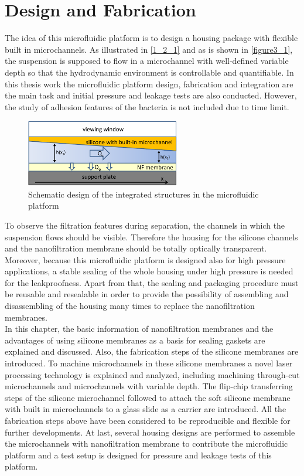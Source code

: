 \chapter{Design and Fabrication} 
\label{3}
The idea of this microfluidic platform is to design a housing package with flexible built in microchannels. As illustrated in \autoref{1_2_1} and as is shown in \autoref{figure3_1}, the suspension is supposed to flow in a microchannel with well-defined variable depth so that the hydrodynamic environment is controllable and quantifiable. In this thesis work the microfluidic platform design, fabrication and integration are the main task and initial pressure and leakage tests are also conducted. However, the study of adhesion features of the bacteria is not included due to time limit.

\begin{figure}[ht]%
\centering
\includegraphics[width=0.6\textwidth]{figures/designandfabrication/figure3_1}%
\caption{Schematic design of the integrated structures in the microfluidic platform}%
\label{figure3_1}%
\end{figure}

To observe the filtration features during separation, the channels in which the suspension flows should be visible. Therefore the housing for the silicone channels and the nanofiltration membrane should be totally optically transparent. Moreover, because this microfluidic platform is designed also for high pressure applications, a stable sealing of the whole housing under high pressure is needed for the leakproofness. Apart from that, the sealing and packaging procedure must be reusable and resealable in order to provide the possibility of assembling and disassembling of the housing many times to replace the nanofiltration membranes. \\

In this chapter, the basic information of nanofiltration membranes and the advantages of using silicone membranes as a basis for sealing gaskets are explained and discussed. Also, the fabrication steps of the silicone membranes are introduced. To machine microchannels in these silicone membranes a novel laser processing technology is explained and analyzed, including machining through-cut microchannels and microchannels with variable depth. The flip-chip transferring steps of the silicone microchannel followed to attach the soft silicone membrane with built in microchannels to a glass slide as a carrier are introduced. All the fabrication steps above have been considered to be reproducible and flexible for further developments. At last, several housing designs are performed to assemble the microchannels with nanofiltration membrane to contribute the microfluidic platform and a test setup is designed for pressure and leakage tests of this platform. 

